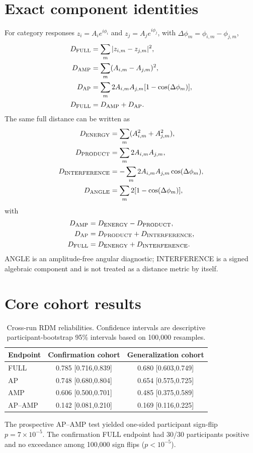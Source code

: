 \documentclass[11pt]{article}
\begin{document}
\section{Exact component identities}
For category responses $z_i=A_i e^{i\phi_i}$ and $z_j=A_j e^{i\phi_j}$, with $\Delta\phi_m=\phi_{i,m}-\phi_{j,m}$,
\begin{align}
D_{\rm FULL}&=\sum_m|z_{i,m}-z_{j,m}|^2,\\
D_{\rm AMP}&=\sum_m(A_{i,m}-A_{j,m})^2,\\
D_{\rm AP}&=\sum_m2A_{i,m}A_{j,m}[1-\cos(\Delta\phi_m)],\\
D_{\rm FULL}&=D_{\rm AMP}+D_{\rm AP}.
\end{align}
The same full distance can be written as
\begin{align}
D_{\rm ENERGY}&=\sum_m(A_{i,m}^2+A_{j,m}^2),\\
D_{\rm PRODUCT}&=\sum_m2A_{i,m}A_{j,m},\\
D_{\rm INTERFERENCE}&=-\sum_m2A_{i,m}A_{j,m}\cos(\Delta\phi_m),\\
D_{\rm ANGLE}&=\sum_m2[1-\cos(\Delta\phi_m)],
\end{align}
with
\begin{align}
D_{\rm AMP}&=D_{\rm ENERGY}-D_{\rm PRODUCT},\\
D_{\rm AP}&=D_{\rm PRODUCT}+D_{\rm INTERFERENCE},\\
D_{\rm FULL}&=D_{\rm ENERGY}+D_{\rm INTERFERENCE}.
\end{align}
ANGLE is an amplitude-free angular diagnostic; INTERFERENCE is a signed algebraic component and is not treated as a distance metric by itself.

\section{Core cohort results}
\begin{table}[h]
\centering
\caption{Cross-run RDM reliabilities. Confidence intervals are descriptive participant-bootstrap 95\% intervals based on 100,000 resamples.}
\begin{tabular}{lcc}
\toprule
Endpoint & Confirmation cohort & Generalization cohort\\
\midrule
FULL & 0.785 [0.716,0.839] & 0.680 [0.603,0.749]\\
AP & 0.748 [0.680,0.804] & 0.654 [0.575,0.725]\\
AMP & 0.606 [0.500,0.701] & 0.485 [0.375,0.589]\\
AP--AMP & 0.142 [0.081,0.210] & 0.169 [0.116,0.225]\\
\bottomrule
\end{tabular}
\end{table}
The prospective AP--AMP test yielded one-sided participant sign-flip $p=7\times10^{-5}$. The confirmation FULL endpoint had 30/30 participants positive and no exceedance among 100,000 sign flips ($p<10^{-5}$).
\end{document}
